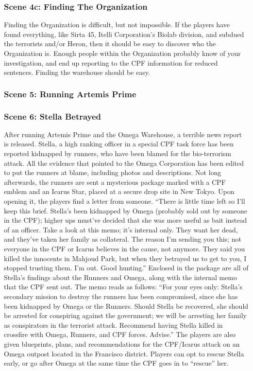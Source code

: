 \documentclass{article}
\begin{document}
\subsubsection{Scene 4c: Finding The Organization}
Finding the Organization is difficult, but not impossible. If the players have
found everything, like Sirta 45, Itelli Corporation’s Biolab division, and subdued the terrorists and/or Heron, then it should be easy to discover who the Organization is. Enough people within the Organization probably know of your investigation, and end up reporting to the CPF information for reduced sentences. Finding the warehouse should be easy.
\subsubsection{Scene 5: Running Artemis Prime}
\subsubsection{Scene 6: Stella Betrayed}
After running Artemis Prime and the Omega Warehouse, a terrible news report is released. Stella, a high ranking officer in a special CPF task force has been reported kidnapped by runners, who have been blamed for the bio-terrorism attack. All the evidence that pointed to the Omega Corporation has been edited to put the runners at blame, including photos and descriptions.
Not long afterwards, the runners are sent a mysterious package marked with a CPF emblem and an Icarus Star, placed at a secure drop site in New Tokyo. Upon opening it, the players find a letter from someone.
“There is little time left so I’ll keep this brief. Stella’s been kidnapped by Omega (probably sold out by someone in the CPF); higher ups must’ve decided that she was more useful as bait instead of an officer. Take a look at this memo; it’s internal only. They want her dead, and they’ve taken her family as collateral. The reason I’m sending you this; not everyone in the CPF or Icarus believes in the cause, not anymore. They said you killed the innocents in Mahjoud Park, but when they betrayed us to get to you, I stopped trusting them. I’m out. Good hunting.”
Enclosed in the package are all of Stella’s findings about the Runners and Omega, along with the internal memo that the CPF sent out. The memo reads as follows:
“For your eyes only: Stella’s secondary mission to destroy the runners has been compromised, since she has been kidnapped by Omega or the Runners. Should Stella be recovered, she should be arrested for conspiring against the government; we will be arresting her family as conspirators in the terrorist attack. Recommend having Stella killed in crossfire with Omega, Runners, and CPF forces. Advise.”
The players are also given blueprints, plans, and recommendations for the CPF/Icarus attack on an Omega outpost located in the Francisco district. Players can opt to rescue Stella early, or go after Omega at the same time the CPF goes in to “rescue” her.
\end{document}
